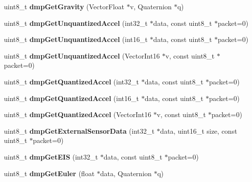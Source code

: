 \begin{DoxyCompactItemize}
uint8\+\_\+t {\bfseries dmp\+Get\+Gravity} (Vector\+Float $\ast$v, Quaternion $\ast$q)
\item 
\mbox{\label{classMPU6050_a1232c8fed01938c6137df40fa2436d31}} 
uint8\+\_\+t {\bfseries dmp\+Get\+Unquantized\+Accel} (int32\+\_\+t $\ast$data, const uint8\+\_\+t $\ast$packet=0)
\item 
\mbox{\label{classMPU6050_a9e427b2ba43ee6e7ba057e7f638836d1}} 
uint8\+\_\+t {\bfseries dmp\+Get\+Unquantized\+Accel} (int16\+\_\+t $\ast$data, const uint8\+\_\+t $\ast$packet=0)
\item 
\mbox{\label{classMPU6050_a814788fea7688802a9f1d91573e94630}} 
uint8\+\_\+t {\bfseries dmp\+Get\+Unquantized\+Accel} (Vector\+Int16 $\ast$v, const uint8\+\_\+t $\ast$packet=0)
\item 
\mbox{\label{classMPU6050_a34f581edc9b3e12a645940e3f700642e}} 
uint8\+\_\+t {\bfseries dmp\+Get\+Quantized\+Accel} (int32\+\_\+t $\ast$data, const uint8\+\_\+t $\ast$packet=0)
\item 
\mbox{\label{classMPU6050_aa180351de905ea4b06502adefc4411d3}} 
uint8\+\_\+t {\bfseries dmp\+Get\+Quantized\+Accel} (int16\+\_\+t $\ast$data, const uint8\+\_\+t $\ast$packet=0)
\item 
\mbox{\label{classMPU6050_a584cb864d829606f98df54c8962ca934}} 
uint8\+\_\+t {\bfseries dmp\+Get\+Quantized\+Accel} (Vector\+Int16 $\ast$v, const uint8\+\_\+t $\ast$packet=0)
\item 
\mbox{\label{classMPU6050_a72afcbd02dbc9d2cd02a9b29dfa1e8f2}} 
uint8\+\_\+t {\bfseries dmp\+Get\+External\+Sensor\+Data} (int32\+\_\+t $\ast$data, uint16\+\_\+t size, const uint8\+\_\+t $\ast$packet=0)
\item 
\mbox{\label{classMPU6050_aa57210108896ae4ed01147fac40592e8}} 
uint8\+\_\+t {\bfseries dmp\+Get\+E\+IS} (int32\+\_\+t $\ast$data, const uint8\+\_\+t $\ast$packet=0)
\item 
\mbox{\label{classMPU6050_ac2bac2a88ecdca4e0aa399c9d93e4cc3}} 
uint8\+\_\+t {\bfseries dmp\+Get\+Euler} (float $\ast$data, Quaternion $\ast$q)

\end{DoxyCompactItemize}
